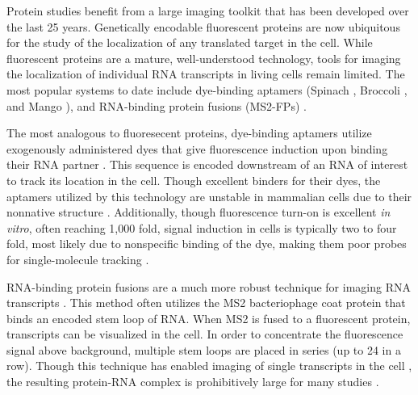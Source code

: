 Protein studies benefit from a large imaging toolkit that has been developed over the last 25 years. Genetically encodable fluorescent proteins are now ubiquitous for the study of the localization of any translated target in the cell. While fluorescent proteins are a mature, well-understood technology, tools for imaging the localization of individual RNA transcripts in living cells remain limited. The most popular systems to date include dye-binding aptamers (Spinach \cite{PaigeRNAMimicsGreen2011}, Broccoli \cite{FilonovBroccoliRapidSelection2014}, and Mango \cite{AutourFluorogenicRNAMango2018,DolgosheinaRNAMangoAptamerFluorophore2014}), and RNA-binding protein fusions (MS2-FPs) \cite{FuscoSinglemRNAMolecules2003,TutucciimprovedMS2system2018}.

The most analogous to fluoresecent proteins, dye-binding aptamers utilize exogenously administered dyes that give fluorescence induction upon binding their RNA partner  \cite{PaigeRNAMimicsGreen2011,FilonovBroccoliRapidSelection2014,AutourFluorogenicRNAMango2018,DolgosheinaRNAMangoAptamerFluorophore2014}.
This sequence is encoded downstream of an RNA of interest to track its location in the cell. Though excellent binders for their dyes, the aptamers utilized by this technology are unstable in mammalian cells due to their nonnative structure \cite{EtzelSyntheticRiboswitchesPlug2017,IiiStructuralbasishighaffinity2017,WarnerStructuralbasisactivity2014,JengFluorophoreligandbinding2016}.
Additionally, though fluorescence turn-on is excellent \textit{in vitro}, often reaching 1,000 fold, signal induction in cells is typically two to four fold, most likely due to nonspecific binding of the dye, making them poor probes for single-molecule tracking \cite{AutourFluorogenicRNAMango2018}.

RNA-binding protein fusions are a much more robust technique for imaging RNA transcripts  \cite{FuscoSinglemRNAMolecules2003}. This method often utilizes the MS2 bacteriophage coat protein that binds an encoded stem loop of RNA. When MS2 is fused to a fluorescent protein, transcripts can be visualized in the cell. In order to concentrate the fluorescence signal above background, multiple stem loops are placed in series (up to 24 in a row). Though this technique has enabled imaging of single transcripts in the cell  \cite{MorisakiRealtimequantificationsingle2016,FuscoSinglemRNAMolecules2003}, the resulting protein-RNA complex is prohibitively large for many studies \cite{TutucciimprovedMS2system2018}.

